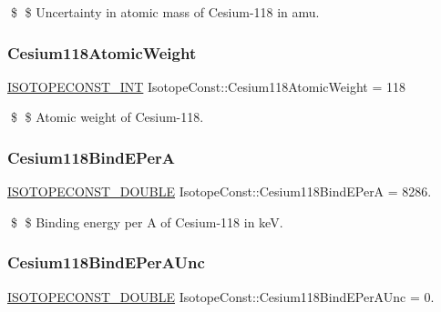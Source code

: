 \$ \$ Uncertainty in atomic mass of Cesium-\/118 in amu. \mbox{\label{group___isotope_const-_cesium-_cs118_ga8fdfb58947e2294dced3b26bc41edb10}} 
\subsubsection{\texorpdfstring{Cesium118\+Atomic\+Weight}{Cesium118AtomicWeight}}
{\footnotesize\ttfamily \mbox{\hyperlink{group___isotope_const-_macros_ga5f18360b3e99483a35c32d789e62621c}{I\+S\+O\+T\+O\+P\+E\+C\+O\+N\+S\+T\+\_\+\+I\+NT}} Isotope\+Const\+::\+Cesium118\+Atomic\+Weight = 118}

\$ \$ Atomic weight of Cesium-\/118. \mbox{\label{group___isotope_const-_cesium-_cs118_ga2b340f9a384f208f9b9ccdad104854b8}} 
\subsubsection{\texorpdfstring{Cesium118\+Bind\+E\+PerA}{Cesium118BindEPerA}}
{\footnotesize\ttfamily \mbox{\hyperlink{group___isotope_const-_macros_ga8f45a7272ce02c0b4c65c44636ed719a}{I\+S\+O\+T\+O\+P\+E\+C\+O\+N\+S\+T\+\_\+\+D\+O\+U\+B\+LE}} Isotope\+Const\+::\+Cesium118\+Bind\+E\+PerA = 8286.}

\$ \$ Binding energy per A of Cesium-\/118 in keV. \mbox{\label{group___isotope_const-_cesium-_cs118_gad4b82ab43ee3522aae0a79fdd87628ef}} 
\subsubsection{\texorpdfstring{Cesium118\+Bind\+E\+Per\+A\+Unc}{Cesium118BindEPerAUnc}}
{\footnotesize\ttfamily \mbox{\hyperlink{group___isotope_const-_macros_ga8f45a7272ce02c0b4c65c44636ed719a}{I\+S\+O\+T\+O\+P\+E\+C\+O\+N\+S\+T\+\_\+\+D\+O\+U\+B\+LE}} Isotope\+Const\+::\+Cesium118\+Bind\+E\+Per\+A\+Unc = 0.}

